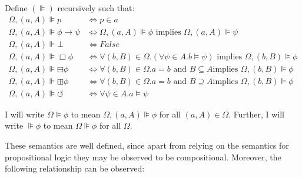 \begin{definition}
 Define $(\VDash)$ recursively such that:
\begin{align*}
  {\Omega},(a,A){\VDash} p & {\iff}p{\in}a\\
  {\Omega},(a,A){\VDash} {\phi}{\rightarrow}{\psi} &
  {\iff}{\Omega},(a,A){\VDash}{\phi}\text{ implies
  }{\Omega},(a,A){\VDash}{\psi}\\
  {\Omega},(a,A){\VDash}{\bot} & {\iff} False\\
  {\Omega},(a,A){\VDash}\Box {\phi} & {\iff}{\forall}(b,B){\in}{\Omega}.
  ({\forall}{\psi}{\in}A. b{\models}{\psi})\text{ implies
  }{\Omega},(b,B){\VDash}{\phi}\\
  {\Omega},(a,A){\VDash}{\boxminus}{\phi} &
  {\iff}{\forall}(b,B){\in}{\Omega}. a=b\text{ and }B{\subseteq}A\text{
  implies }{\Omega},(b,B){\VDash}{\phi}\\
  {\Omega},(a,A){\VDash}{\boxplus}{\phi} &
  {\iff}{\forall}(b,B){\in}{\Omega}. a=b\text{ and }B{\supseteq}A\text{
  implies }{\Omega},(b,B){\VDash}{\phi}\\
  {\Omega},(a,A){\VDash}{\circlearrowleft} & {\iff}
  {\forall}{\psi}{\in}A.a{\models}{\psi}
\end{align*}
\end{definition}
\begin{remark}
I will write $\Omega \VDash \phi$ to mean $\Omega, (a,A) \VDash \phi$
for all $(a,A) \in \Omega$.  Further, I will write $\VDash \phi$ to
mean $\Omega \VDash \phi$ for all $\Omega$.
\end{remark}
These semantics are well defined, since apart from relying on the semantics
for propositional logic they may be observed to be compositional.
Moreover, the following relationship can be observed:

